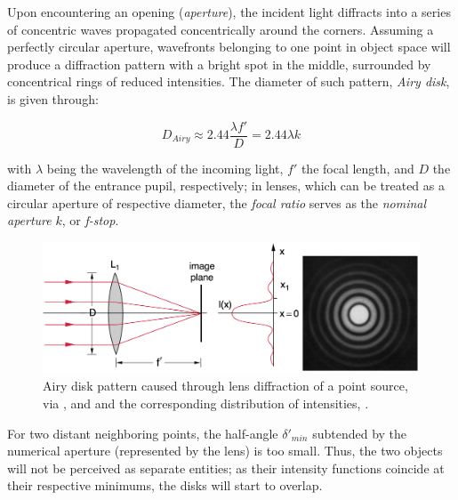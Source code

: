 Upon encountering an opening (\textit{aperture}), the incident light diffracts into a series of concentric waves propagated concentrically around the corners. Assuming a perfectly circular aperture, wavefronts belonging to one point in object space will produce a diffraction pattern with a bright spot in the middle, surrounded by concentrical rings of reduced intensities. The diameter of such pattern, \textit{Airy disk}, is given through:

\begin{displaymath}
    D_{Airy} \approx 2.44 \frac{\lambda {f}'}{D} = 2.44 \lambda  k
\end{displaymath}

with $\lambda$ being the wavelength of the incoming light, ${f}'$ the focal length, and $D$ the diameter of the entrance pupil, respectively; in lenses, which can be treated as a circular aperture of respective diameter, the \textit{focal ratio} serves as the \textit{nominal aperture} $k$, or \textit{f-stop}. 

\begin{figure}[h]
  \centering
  \includegraphics[width=\linewidth]{imgs/optics/airy.png}
  \caption{Airy disk pattern caused through lens diffraction of a point source, via \cite{Cagnet1962}, and and the corresponding distribution of intensities, \cite{Demtroeder2018}.}
  \label{fig:airy}
\end{figure}

For two distant neighboring points, the half-angle ${\delta}'_{min}$ subtended by the numerical aperture (represented by the lens) is too small. Thus, the two objects will not be perceived as separate entities; as their intensity functions coincide at their respective minimums, the disks will start to overlap. 

